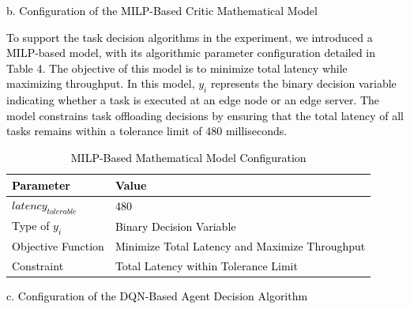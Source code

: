 \documentclass[preprint,12pt]{elsarticle}
\begin{document}
\textcolor{black}{b.	Configuration of the MILP-Based Critic Mathematical Model}

\textcolor{black}{To support the task decision algorithms in the experiment, we introduced a MILP-based model, with its algorithmic parameter configuration detailed in Table 4. The objective of this model is to minimize total latency while maximizing throughput. In this model, \(y_i\) represents the binary decision variable indicating whether a task is executed at an edge node or an edge server. The model constrains task offloading decisions by ensuring that the total latency of all tasks remains within a tolerance limit of 480 milliseconds.}

\textcolor{black}{
\begin{table}[ht!]
    \begin{tabularx}{\textwidth} {m{}<{\raggedright}m{}<{\raggedright}}
    \hline
    \textbf{Parameter} & \textbf{Value} \\
    \hline
    $latency_{tolerable}$ & 480\\
    Type of \(y_i\) & Binary Decision Variable\\
    Objective Function & Minimize Total Latency and Maximize Throughput\\
    Constraint & Total Latency within Tolerance Limit\\
    \hline
    \end{tabularx}
    \caption{MILP-Based Mathematical Model Configuration}
\end{table}}

\textcolor{black}{c.	Configuration of the DQN-Based Agent Decision Algorithm}
\end{document}
